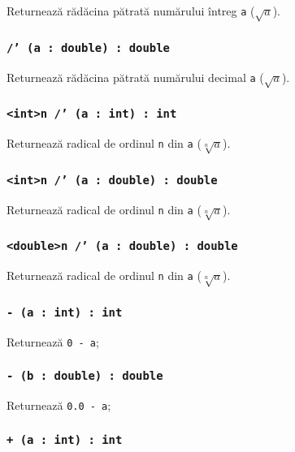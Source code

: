 Returnează rădăcina pătrată numărului întreg \texttt{a} ($\sqrt{a}$).

\subsubsection{\texttt{/' (a : double) : double}}

Returnează rădăcina pătrată numărului decimal \texttt{a} ($\sqrt{a}$).

\subsubsection{\texttt{<int>n /' (a : int) : int}}

Returnează radical de ordinul \texttt{n} din \texttt{a} ($\sqrt[n]{a}$).

\subsubsection{\texttt{<int>n /' (a : double) : double}}

Returnează radical de ordinul \texttt{n} din \texttt{a} ($\sqrt[n]{a}$).

\subsubsection{\texttt{<double>n /' (a : double) : double}}

Returnează radical de ordinul \texttt{n} din \texttt{a} ($\sqrt[n]{a}$).


\subsubsection{\texttt{- (a : int) : int}}

Returnează \texttt{0 - a};

\subsubsection{\texttt{- (b : double) : double}}

Returnează \texttt{0.0 - a};

\subsubsection{\texttt{+ (a : int) : int}}

